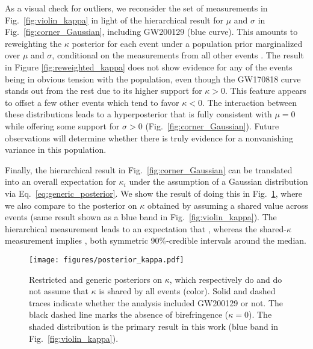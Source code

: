 \documentclass[aps,prd,twocolumn,superscriptaddress,preprintnumbers,nofootinbib]{revtex4-2}
\begin{document}
As a visual check for outliers, we reconsider the set of measurements in Fig.~\ref{fig:violin_kappa} in light of the hierarchical result for $\mu$ and $\sigma$ in Fig.~\ref{fig:corner_Gaussian}, including GW200129 (blue curve).
This amounts to reweighting the $\kappa$ posterior for each event under a population prior marginalized over $\mu$ and $\sigma$, conditional on the measurements from all other events \cite{Miller2020,Callister:T2100301}.
The result in Figure \ref{fig:reweighted_kappa} does not show evidence for any of the events being in obvious tension with the population, even though the GW170818 curve stands out from the rest due to its higher support for $\kappa > 0$.
This feature appears to offset a few other events which tend to favor $\kappa < 0$.
The interaction between these distributions leads to a hyperposterior that is fully consistent with $\mu = 0$ while offering some support for $\sigma > 0$ (Fig.~\ref{fig:corner_Gaussian}).
Future observations will determine whether there is truly evidence for a nonvanishing variance in this population.

Finally, the hierarchical result in Fig.~\ref{fig:corner_Gaussian} can be translated into an overall expectation for $\kappa_i$ under the assumption of a Gaussian distribution via Eq.~\eqref{eq:generic_posterior}.
We show the result of doing this in Fig.~\ref{fig:posterior_kappa}, where we also compare to the posterior on $\kappa$ obtained by assuming a shared value across events (same result shown as a blue band in Fig.~\ref{fig:violin_kappa}).
The hierarchical measurement leads to an expectation that , whereas the shared-$\kappa$ measurement implies , both symmetric 90\%-credible intervals around the median.  

\begin{figure}
    \texttt{[image: figures/posterior\_kappa.pdf]}
    \caption{
        Restricted and generic posteriors on $\kappa$, which respectively do and do not assume that $\kappa$ is shared by all events (color).
        Solid and dashed traces indicate whether the analysis included GW200129 or not.
        The black dashed line marks the absence of birefringence ($\kappa=0$).
        The shaded distribution is the primary result in this work (blue band in Fig.~\ref{fig:violin_kappa}).
    }
    \label{fig:posterior_kappa}
\end{figure}
\end{document}
